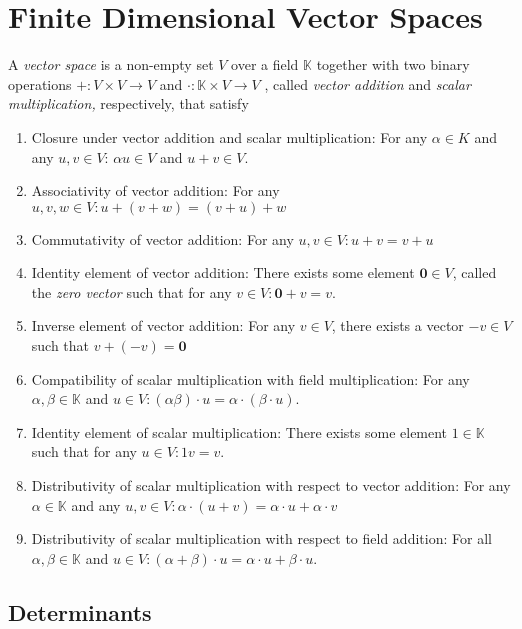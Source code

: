 
\chapter{\label{chap:finiteVectorSpace}Finite Dimensional Vector Spaces}
\begin{defn}
\label{def:vectorSpace}A \emph{vector space }is a non-empty set \emph{$V$
}over a field $\mathbb{K}$ together with two binary operations $+:V\times V\to V$
and $\cdot:\mathbb{K}\times V\to V$ , called \emph{vector addition
}and \emph{scalar multiplication, }respectively, that satisfy
\end{defn}

\begin{enumerate}
\item Closure under vector addition and scalar multiplication: For any $\alpha\in K$
and any $u,v\in V$: $\alpha u\in V$ and $u+v\in V.$
\item Associativity of vector addition: For any $u,v,w\in V:u+\left(v+w\right)=\left(v+u\right)+w$
\item Commutativity of vector addition: For any $u,v\in V:u+v=v+u$
\item Identity element of vector addition: There exists some element $\mathbf{0}\in V$,
called the \emph{zero vector }such that for any $v\in V:\mathbf{0}+v=v.$
\item Inverse element of vector addition: For any $v\in V$, there exists
a vector $-v\in V$ such that $v+\left(-v\right)=\mathbf{0}$
\item Compatibility of scalar multiplication with field multiplication:
For any $\alpha,\beta\in\mathbb{K}$ and $u\in V:\left(\alpha\beta\right)\cdot u=\alpha\cdot\left(\beta\cdot u\right).$
\item Identity element of scalar multiplication: There exists some element
$1\in\mathbb{K}$ such that for any $u\in V:1v=v.$
\item Distributivity of scalar multiplication with respect to vector addition:
For any $\alpha\in\mathbb{K}$ and any $u,v\in V:\alpha\cdot\left(u+v\right)=\alpha\cdot u+\alpha\cdot v$
\item Distributivity of scalar multiplication with respect to field addition:
For all $\alpha,\beta\in\mathbb{K}$ and $u\in V:\left(\alpha+\beta\right)\cdot u=\alpha\cdot u+\beta\cdot u.$
\end{enumerate}

\section{Determinants}
